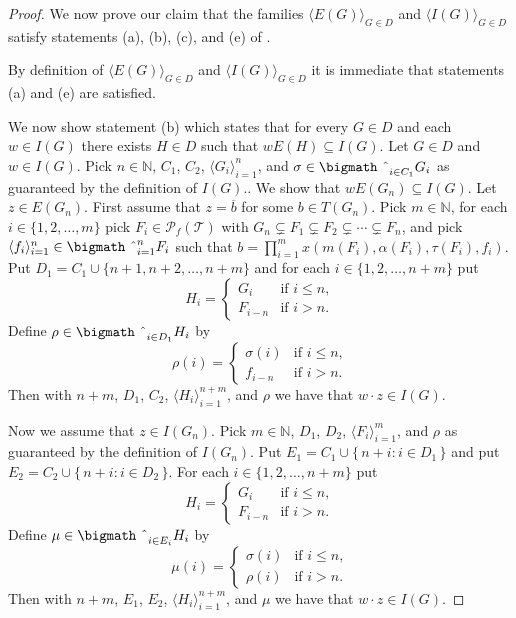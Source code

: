 \documentclass[12pt,showtrims]{memoir}
\theoremstyle{plain}
\theoremstyle{definition}
\newcommand{\la}{\langle}
\newcommand{\ra}{\rangle}
\newcommand{\bbN}{\mathbb{N}}
\newcommand{\calT}{\mathcal{T}}
\newcommand{\Pf}{\mathcal{P}_f}
\newcommand{\bigtimes}{\hbox{\bigmath \char'2}}
\begin{document}
\begin{proof}
  We now prove our claim that the families $\la E(G) \ra_{G \in D}$ and $\la I(G) \ra_{G \in D}$ satisfy statements (a), (b), (c), and (e) of \cite[Lemma 14.9]{Hindman:1998fk}.

  By definition of $\la E(G) \ra_{G \in D}$ and $\la I(G) \ra_{G \in D}$ it is immediate that statements (a) and (e) are satisfied. 

  We now show statement (b) which states that for every $G \in D$ and each $w \in I(G)$ there exists $H \in D$ such that $w E(H) \subseteq I(G)$.
  Let $G \in D$ and $w \in I(G)$. 
  Pick $n \in \bbN$, $C_1$, $C_2$, $\la G_i \ra_{i=1}^n$, and $\sigma \in \bigtimes_{i \in C_1} G_i$ as guaranteed by the definition of $I(G)$..
  We show that $w E(G_n) \subseteq I(G)$. 
  Let $z \in E(G_n)$. 
  First assume that $z = \overline{b}$ for some $b \in T(G_n)$. 
  Pick $m \in \bbN$, for each $i \in \{1, 2, \ldots, m\}$ pick $F_i \in \Pf(\calT)$ with $G_n \subsetneq F_1 \subsetneq F_2 \subsetneq \cdots \subsetneq F_n$, and pick $\la f_i \ra_{i=1}^n \in \bigtimes_{i=1}^n F_i$ such that $b = \prod_{i=1}^m x(m(F_i), \alpha(F_i), \tau(F_i), f_i)$. 
  Put $D_1 = C_1 \cup \{n+1, n+2, \ldots, n+m\}$ and for each $i \in \{1, 2, \ldots, n+m\}$ put 
  \[
    H_i = 
    \begin{cases}
      G_i & \mbox{if $i \le n$,} \\
      F_{i-n} & \mbox{if $i > n$.}
    \end{cases}
  \]
  Define $\rho \in \bigtimes_{i \in D_1} H_i$ by 
  \[
    \rho(i) =
    \begin{cases}
      \sigma(i) & \mbox{if $i \le n$,} \\
      f_{i-n} & \mbox{if $i > n$.}
    \end{cases}
  \]
  Then with $n+m$, $D_1$, $C_2$, $\la H_i \ra_{i=1}^{n+m}$, and $\rho$ we have that $w \cdot z \in I(G)$. 

  Now we assume that $z \in I(G_n)$. 
  Pick $m \in \bbN$, $D_1$, $D_2$, $\la F_i \ra_{i=1}^m$, and $\rho$ as guaranteed by the definition of $I(G_n)$. 
  Put $E_1 = C_1 \cup \{\,n + i : i \in D_1 \,\}$ and put $E_2 = C_2 \cup \{\, n + i : i \in D_2 \,\}$.
  For each $i \in \{1, 2, \ldots, n+m\}$ put
  \[
    H_i = 
    \begin{cases}
      G_i & \mbox{if $i \le n$,} \\
      F_{i-n} & \mbox{if $i > n$.}
    \end{cases}
  \]
  Define $\mu \in \bigtimes_{i \in E_i} H_i$ by
  \[
    \mu(i) = 
    \begin{cases}
      \sigma(i) & \mbox{if $i \le n$,} \\
      \rho(i) & \mbox{if $i > n$.}
    \end{cases}
  \]
  Then with $n+m$, $E_1$, $E_2$, $\la H_i \ra_{i=1}^{n+m}$, and $\mu$ we have that $w \cdot z \in I(G)$.


\end{proof}
\end{document}
